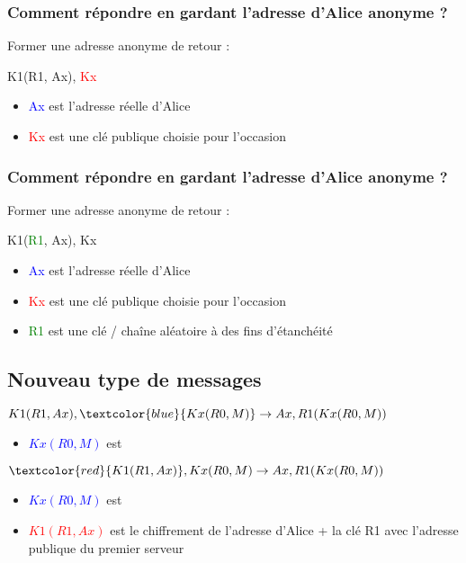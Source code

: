 \documentclass{beamer}
\begin{document}
\begin{frame}
\frametitle{Comment répondre en gardant l'adresse d'Alice anonyme ?}
Former une adresse anonyme de retour :
\begin{center}
K1(R1, Ax), \textcolor{red}{Kx}
\end{center}
\begin{itemize}
[triangle]
\item \textcolor{blue}{Ax} est l'adresse réelle d'Alice
\item \textcolor{red}{Kx} est une clé publique choisie pour l'occasion
\end{itemize}
\end{frame}

\begin{frame}
\frametitle{Comment répondre en gardant l'adresse d'Alice anonyme ?}
Former une adresse anonyme de retour :
\begin{center}
K1(\textcolor{green}{R1}, Ax), Kx
\end{center}
\begin{itemize}
[triangle]
\item \textcolor{blue}{Ax} est l'adresse réelle d'Alice
\item \textcolor{red}{Kx} est une clé publique choisie pour l'occasion
\item \textcolor{green}{R1} est une clé / chaîne aléatoire à des fins d'étanchéité
\end{itemize}
\end{frame}

\subsection{Nouveau type de messages}
\begin{frame}
\begin{center}
$K1( R1, Ax ), \textcolor{blue}{Kx( R0, M )} \rightarrow Ax, R1( Kx( R0, M ))$
\end{center}
\begin{itemize}
[triangle]
\item \textcolor{blue}{$Kx( R0, M )$} est 
\end{itemize}
\end{frame}

\begin{frame}
\begin{center}
$\textcolor{red}{K1( R1, Ax )}, Kx( R0, M ) \rightarrow Ax, R1( Kx( R0, M ))$
\end{center}
\begin{itemize}
[triangle]
\item \textcolor{blue}{$Kx( R0, M )$} est 
\item \textcolor{red}{$K1( R1, Ax )$} est le chiffrement de l'adresse d'Alice + la clé R1 avec l'adresse publique du premier serveur
\end{itemize}
\end{frame}
\end{document}
